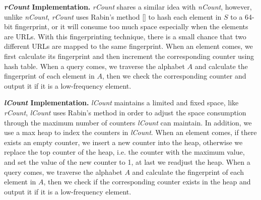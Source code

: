 \documentclass[conference]{IEEEtran}
\begin{document}
\textbf{\emph{rCount} Implementation.} \emph{rCount} shares a similar idea with \emph{nCount}, however, unlike \emph{nCount}, \emph{rCount} uses Rabin's method [] to hash each element in $S$ to a 64-bit fingerprint, or it will consume too much space especially when the elements are URLs. With this fingerprinting technique, there is a small chance that two diﬀerent URLs are mapped to the same fingerprint. When an element comes, we first calculate its fingerprint and then increment the corresponding counter using hash table. When a query comes, we traverse the alphabet $A$ and calculate the fingerprint of each element in $A$, then we check the corresponding counter and output it if it is a low-frequency element.\par

\textbf{\emph{lCount} Implementation.} \emph{lCount} maintains a limited and fixed space, like \emph{rCount}, \emph{lCount} uses Rabin's method in order to adjust the space consumption through the maximum number of counters \emph{lCount} can maintain. In addition, we use a max heap to index the counters in \emph{lCount}. When an element comes, if there exists an empty counter, we insert a new counter into the heap, otherwise we replace the top counter of the heap, i.e. the counter with the maximum value, and set the value of the new counter to 1, at last we readjust the heap. When a query comes, we traverse the alphabet $A$ and calculate the fingerprint of each element in $A$, then we check if the corresponding counter exists in the heap and output it if it is a low-frequency element.\par
\end{document}
